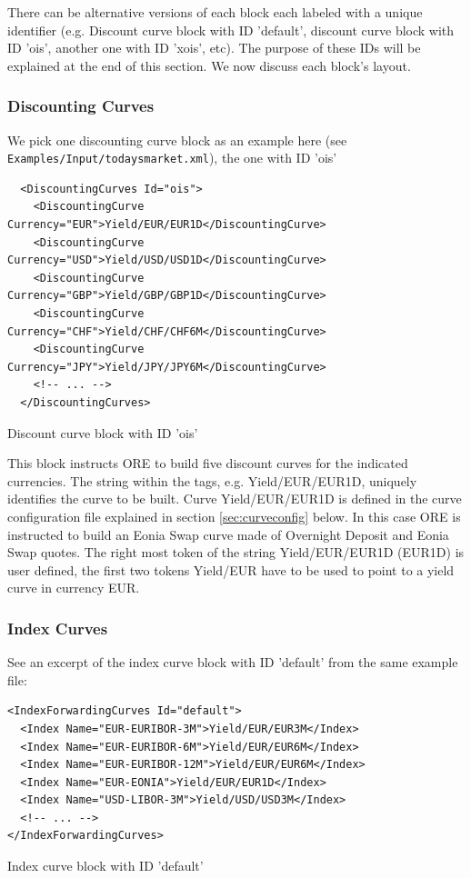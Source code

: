\documentclass[12pt, a4paper]{article}
\begin{document}
There can be alternative versions of each block each labeled with a unique identifier (e.g. Discount curve block with ID
'default', discount curve block with ID 'ois', another one with ID 'xois', etc). The purpose of these IDs will be
explained at the end of this section. We now discuss each block's layout.

\subsubsection{Discounting Curves} 

We pick one discounting curve block as an example here (see {\tt Examples/Input/todaysmarket.xml}), the one with ID 'ois' 

\begin{listing}[H]
\begin{verbatim}
  <DiscountingCurves Id="ois">
    <DiscountingCurve Currency="EUR">Yield/EUR/EUR1D</DiscountingCurve>
    <DiscountingCurve Currency="USD">Yield/USD/USD1D</DiscountingCurve>
    <DiscountingCurve Currency="GBP">Yield/GBP/GBP1D</DiscountingCurve>
    <DiscountingCurve Currency="CHF">Yield/CHF/CHF6M</DiscountingCurve>
    <DiscountingCurve Currency="JPY">Yield/JPY/JPY6M</DiscountingCurve>
    <!-- ... -->
  </DiscountingCurves>
\end{verbatim}
\caption{Discount curve block with ID 'ois'}
\label{lst:discountcurve_spec}
\end{listing}

This block instructs ORE to build five discount curves for the indicated currencies. The string within the tags,
e.g. Yield/EUR/EUR1D, uniquely identifies the curve to be built.  Curve Yield/EUR/EUR1D is defined in the curve
configuration file explained in section \ref{sec:curveconfig} below. In this case ORE is instructed to build an Eonia
Swap curve made of Overnight Deposit and Eonia Swap quotes. The right most token of the string Yield/EUR/EUR1D (EUR1D)
is user defined, the first two tokens Yield/EUR have to be used to point to a yield curve in currency EUR.
 
\subsubsection{Index Curves} 

See an excerpt of the index curve block with ID 'default' from the same example file:

\begin{listing}[H]
\begin{verbatim}
<IndexForwardingCurves Id="default">
  <Index Name="EUR-EURIBOR-3M">Yield/EUR/EUR3M</Index>
  <Index Name="EUR-EURIBOR-6M">Yield/EUR/EUR6M</Index>
  <Index Name="EUR-EURIBOR-12M">Yield/EUR/EUR6M</Index>
  <Index Name="EUR-EONIA">Yield/EUR/EUR1D</Index>
  <Index Name="USD-LIBOR-3M">Yield/USD/USD3M</Index>
  <!-- ... -->
</IndexForwardingCurves>
\end{verbatim}
\caption{Index curve block with ID 'default'}
\label{lst:indexcurve_spec}
\end{listing}
\end{document}
